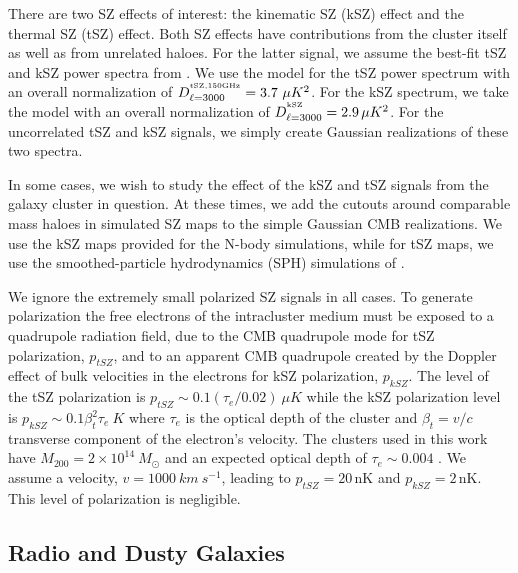 There are two SZ effects of interest: the kinematic SZ (kSZ) effect and the thermal SZ (tSZ) effect. Both SZ effects have contributions from the cluster itself as well as from unrelated haloes. For the latter signal, we assume the best-fit tSZ and kSZ power spectra from \citet{george2015}. 
We use the \citet{shaw2010} model for the tSZ power spectrum with an overall normalization of \mbox{$D_{\ell=3000}^{^{\rm tSZ, 150 GHz}} = 3.7\ \mu K^{2}$}. For the kSZ spectrum, we take the \citet{shaw2012} model  with an overall normalization of \mbox{$D_{\ell=3000}^{^{\rm kSZ}} = 2.9\, \mu K^{2}$}. For the uncorrelated tSZ and kSZ signals, we simply create Gaussian realizations of these two spectra. 

In some cases, we wish to study the effect of the kSZ and tSZ signals from the galaxy cluster in question. %
At these times, we add the cutouts around comparable mass haloes in simulated SZ maps to the simple Gaussian CMB realizations. We use the kSZ maps provided for the \citet{flender2016} N-body simulations, while for tSZ maps, we use the smoothed-particle hydrodynamics (SPH) simulations of  \citet{mccarthy2013}. 

We ignore the extremely small polarized SZ signals in all cases. To generate polarization the free electrons of the intracluster medium must be exposed to a quadrupole radiation field, due to the CMB quadrupole mode for tSZ polarization, $p_{tSZ}$, and to an apparent CMB quadrupole created by the Doppler effect of bulk velocities in the electrons for kSZ polarization, $p_{kSZ}$. The level of the tSZ polarization is $p_{tSZ} \sim 0.1 (\tau_{e}/0.02)\ \mu K$ while the kSZ polarization level is $p_{kSZ} \sim 0.1 \beta_{t}^{2}\tau_{e}\ K$ \citep{sazonov1999, carlstrom2002} where $\tau_{e}$ is the optical depth of the cluster and $\beta_{t} = v/c$ transverse component of the electron's velocity. The clusters used in this work have $M_{200} =  2 \times 10^{14}\ M_{\odot}$ and an expected optical depth of $\tau_{e} \sim 0.004$ \citep{flender2016b}. 
We assume a velocity, $v = 1000\ km\ s^{-1}$, leading to $p_{tSZ}=20$\,nK and $p_{kSZ} =2$\,nK. This level of polarization is negligible.

\subsection{Radio and Dusty Galaxies}
\label{sec_appendix_extragal}

